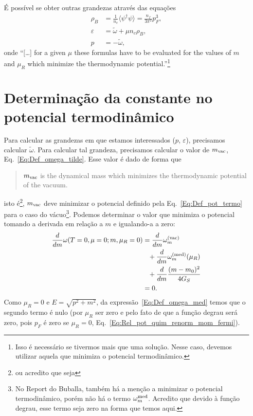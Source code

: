 É possível se obter outras grandezas através das equações
\begin{align}
	\rho_B &= \frac{1}{n_c} \langle\psi^\dagger\psi\rangle = \frac{n_f}{3\pi^2}p_F^3, \label{Eq:Rel_Dens_Mom_Fermi_NJL}\\
	\varepsilon &= \tilde{\omega} + \mu n_c \rho_B, \label{Eq:Energia_omega_tilde}\\
	p &= - \tilde{\omega}, \label{Eq:Pressao_omega_tilde}
\end{align}
%
onde ``[\dots] for a given $\mu$ these formulas have to be evaluated for the values of $m$ and $\mu_R$ which minimize the thermodynamic potential.''\footnote{Isso é necessário se tivermos mais que uma solução. Nesse caso, devemos utilizar aquela que minimiza o potencial termodinâmico.}

\section{Determinação da constante no potencial termodinâmico}
\label{Sec:M_vac}

Para calcular as grandezas em que estamos interessados ($p$, $\varepsilon$), precisamos calcular $\tilde{\omega}$. Para calcular tal grandeza, precisamos calcular o valor de $m_{\rm{vac}}$, Eq.~\eqref{Eq:Def_omega_tilde}. Esse valor é dado de forma que \parencite{Buballa1996}
\begin{quote}
	$m_{\rm{vac}}$ is the dynamical mass which minimizes the thermodynamic potential of the vacuum.
\end{quote}
%
isto é\footnote{ou acredito que seja}, $m_{\rm{vac}}$ deve minimizar o potencial definido pela Eq.~\ref{Eq:Def_pot_termo} para o caso do vácuo\footnote{No Report do Buballa, também há a menção a minimizar o potencial termodinâmico, porém não há o termo $\omega_m^{\rm{med}}$. Acredito que devido à função degrau, esse termo seja zero na forma que temos aqui.}. Podemos determinar o valor que minimiza o potencial tomando a derivada em relação a $m$ e igualando-a a zero:
\begin{align}
	\frac{d}{dm} \omega(T = 0,\mu = 0; m, \mu_R = 0) &= \frac{d}{dm}\omega_m^{\rm{(vac)}} \\
	&\phantom{=} + \frac{d}{dm}\omega_m^{\rm{(med)}}(\mu_R) \nonumber \\
	&\phantom{=} + \frac{d}{dm}\frac{(m - m_0)^2}{4G_S} \nonumber \\
	&= 0.\nonumber
\end{align}
%
Como $\mu_R = 0$ e $E = \sqrt{p^2+m^2}$, da expressão~\eqref{Eq:Def_omega_med} temos que o segundo termo é nulo (por $\mu_R$ ser zero e pelo fato de que a função degrau será zero, pois $p_F$ é zero se $\mu_R = 0$, Eq.~\eqref{Eq:Rel_pot_quim_renorm_mom_fermi}).

